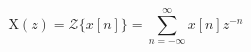 \begin{equation}
    \mathrm{X} (z) = \mathscr{Z} \{x[n]\} = \sum\limits_{n=-\infty}^{\infty}
x[n] z^{-n}
    \label{eq:ztransform}
\end{equation}
